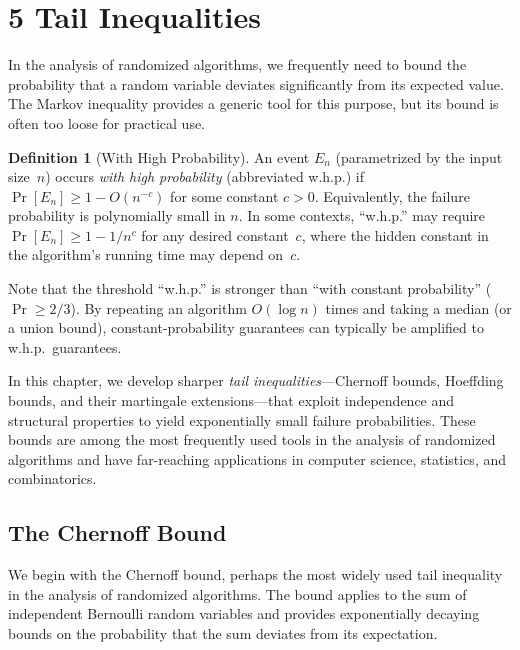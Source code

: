 \documentclass[twoside,12pt]{book}
\theoremstyle{plain}
\theoremstyle{definition}
\newtheorem{definition}[theorem]{Definition}
\theoremstyle{remark}
\begin{document}
\chapter*{5 Tail Inequalities}
\label{ch:tail-inequalities}

In the analysis of randomized algorithms, we frequently need to bound the
probability that a random variable deviates significantly from its expected
value. The Markov inequality provides a generic tool for this purpose, but
its bound is often too loose for practical use.

\begin{definition}[With High Probability]
\label{def:whp}
An event $E_n$ (parametrized by the input size~$n$) occurs \emph{with high
probability} (abbreviated w.h.p.) if $\Pr[E_n] \ge 1 - O(n^{-c})$ for some
constant $c > 0$.  Equivalently, the failure probability is polynomially
small in $n$.  In some contexts, ``w.h.p.'' may require
$\Pr[E_n] \ge 1 - 1/n^c$ for any desired constant~$c$, where the hidden
constant in the algorithm's running time may depend on~$c$.
\end{definition}

Note that the threshold ``w.h.p.'' is stronger than ``with constant
probability'' ($\Pr \ge 2/3$).  By repeating an algorithm $O(\log n)$
times and taking a median (or a union bound), constant-probability
guarantees can typically be amplified to w.h.p.\ guarantees.

In this chapter, we develop
sharper \emph{tail inequalities}---Chernoff bounds, Hoeffding bounds, and
their martingale extensions---that exploit independence and structural
properties to yield exponentially small failure probabilities. These bounds
are among the most frequently used tools in the analysis of randomized
algorithms and have far-reaching applications in computer science,
statistics, and combinatorics.

\section{The Chernoff Bound}
\label{sec:chernoff}

We begin with the Chernoff bound, perhaps the most widely used tail
inequality in the analysis of randomized algorithms. The bound applies to
the sum of independent Bernoulli random variables and provides
exponentially decaying bounds on the probability that the sum deviates
from its expectation.
\end{document}
